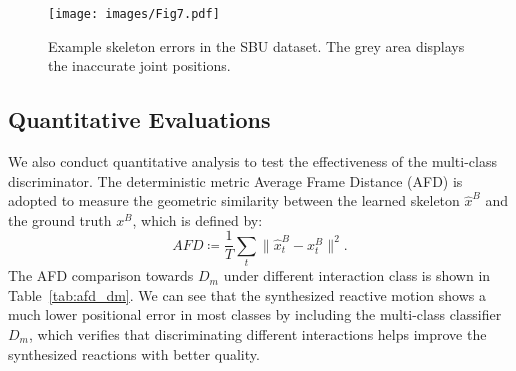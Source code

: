 \documentclass[times,twocolumn,final]{elsarticle}
\begin{document}
\begin{figure}
\centering\texttt{[image: images/Fig7.pdf]}
\caption{Example skeleton errors in the SBU dataset. The grey area displays the inaccurate joint positions.}
\label{fig:7} 
\end{figure}


\subsection{Quantitative Evaluations}
\label{sec:4.3}
We also conduct quantitative analysis to test the effectiveness of the multi-class discriminator. The deterministic metric Average Frame Distance (AFD) is adopted to measure the geometric similarity between the learned skeleton $\hat{x}^{B}$ and the ground truth $x^{B}$, which is defined by: 
\begin{equation}
AFD\coloneqq \frac{1}{T}\sum_{t}\lVert\hat{x}_{t}^{B}-x_{t}^{B}\rVert^2.
\end{equation} 
The AFD comparison towards $D_{m}$ under different interaction class is shown in Table~\ref{tab:afd_dm}. We can see that the synthesized reactive motion shows a much lower positional error in most classes by including the multi-class classifier $D_m$, which verifies that discriminating different interactions helps improve the synthesized reactions with better quality.

\end{document}
